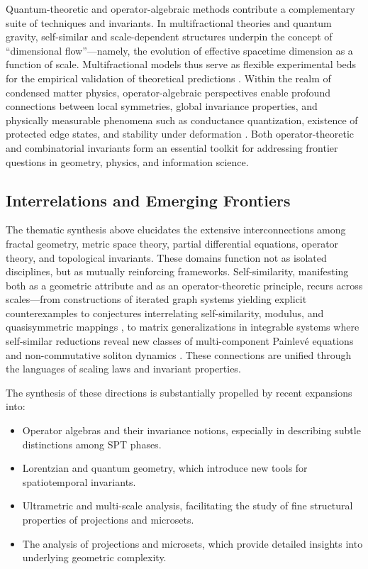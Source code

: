 \documentclass[sigconf]{acmart}
\begin{document}
Quantum-theoretic and operator-algebraic methods contribute a complementary suite of techniques and invariants. In multifractional theories and quantum gravity, self-similar and scale-dependent structures underpin the concept of ``dimensional flow''---namely, the evolution of effective spacetime dimension as a function of scale. Multifractional models thus serve as flexible experimental beds for the empirical validation of theoretical predictions \cite{ref5,ref7,ref20}. Within the realm of condensed matter physics, operator-algebraic perspectives enable profound connections between local symmetries, global invariance properties, and physically measurable phenomena such as conductance quantization, existence of protected edge states, and stability under deformation \cite{ref56,ref57,ref58}. Both operator-theoretic and combinatorial invariants form an essential toolkit for addressing frontier questions in geometry, physics, and information science.

\subsection{Interrelations and Emerging Frontiers}

The thematic synthesis above elucidates the extensive interconnections among fractal geometry, metric space theory, partial differential equations, operator theory, and topological invariants. These domains function not as isolated disciplines, but as mutually reinforcing frameworks. Self-similarity, manifesting both as a geometric attribute and as an operator-theoretic principle, recurs across scales—from constructions of iterated graph systems yielding explicit counterexamples to conjectures interrelating self-similarity, modulus, and quasisymmetric mappings \cite{ref35}, to matrix generalizations in integrable systems where self-similar reductions reveal new classes of multi-component Painlevé equations and non-commutative soliton dynamics \cite{ref64}. These connections are unified through the languages of scaling laws and invariant properties.

The synthesis of these directions is substantially propelled by recent expansions into:

\begin{itemize}
    \item Operator algebras and their invariance notions, especially in describing subtle distinctions among SPT phases.
    \item Lorentzian and quantum geometry, which introduce new tools for spatiotemporal invariants.
    \item Ultrametric and multi-scale analysis, facilitating the study of fine structural properties of projections and microsets.
    \item The analysis of projections and microsets, which provide detailed insights into underlying geometric complexity.
\end{itemize}
\end{document}
